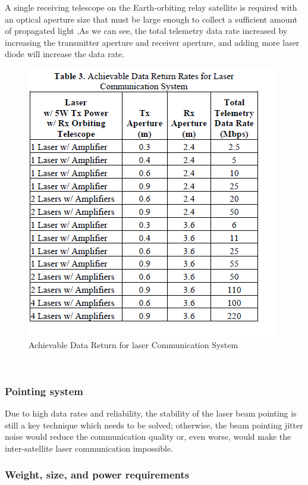 A single receiving telescope on the Earth-orbiting relay satellite is required with an optical aperture size that must be large enough to collect a sufficient amount of propagated light ,As we can see, the total telemetry data rate increased by increasing the transmitter aperture and receiver aperture, and adding more laser diode will increase the data rate. 
\begin{figure}[htb]
\begin{center}
\includegraphics[width=0.7\columnwidth]{figures/laser-communication/bh5.png}
\caption{Achievable Data Return for laser Communication System}
\end{center}
\end{figure}
\\

\subsubsection{Pointing system}

Due to high data rates and reliability, the stability of the laser beam pointing is still a key technique which needs to be solved; otherwise, the beam pointing jitter noise would reduce the communication quality or, even worse, would make the inter-satellite laser communication impossible. 

\subsubsection{Weight, size, and power requirements}

